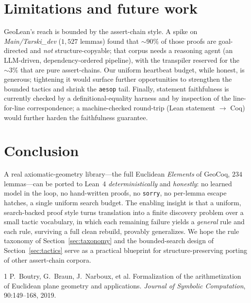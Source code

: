 \documentclass{article}
\begin{document}
\section{Limitations and future work}
\label{sec:future}

GeoLean's reach is bounded by the assert-chain style. A spike on \emph{Main/Tarski\_dev}
($1{,}527$ lemmas) found that ${\sim}90\%$ of those proofs are goal-directed and \emph{not}
structure-copyable; that corpus needs a reasoning agent (an LLM-driven, dependency-ordered
pipeline), with the transpiler reserved for the ${\sim}3\%$ that are pure assert-chains. Our
uniform heartbeat budget, while honest, is generous; tightening it would surface further
opportunities to strengthen the bounded tactics and shrink the \texttt{aesop} tail. Finally,
statement faithfulness is currently checked by a definitional-equality harness and by inspection
of the line-for-line correspondence; a machine-checked round-trip (Lean statement $\to$ Coq) would
further harden the faithfulness guarantee.

\section{Conclusion}

A real axiomatic-geometry library---the full Euclidean \emph{Elements} of GeoCoq, $234$
lemmas---can be ported to Lean~4 \emph{deterministically} and \emph{honestly}: no learned model in
the loop, no hand-written proofs, no \texttt{sorry}, no per-lemma escape hatches, a single uniform
search budget. The enabling insight is that a uniform, search-backed proof style turns translation
into a finite discovery problem over a small tactic vocabulary, in which each remaining failure
yields a \emph{general} rule and each rule, surviving a full clean rebuild, provably generalizes.
We hope the rule taxonomy of Section~\ref{sec:taxonomy} and the bounded-search design of
Section~\ref{sec:tactics} serve as a practical blueprint for structure-preserving porting of other
assert-chain corpora.

{\small

\begin{thebibliography}{1}
P.~Boutry, G.~Braun, J.~Narboux, et al.
\newblock Formalization of the arithmetization of Euclidean plane geometry and applications.
\newblock \emph{Journal of Symbolic Computation}, 90:149--168, 2019.
\end{thebibliography}
}
\end{document}

